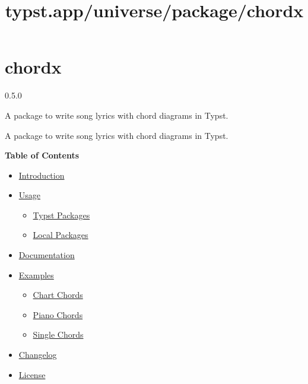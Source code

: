 \title{typst.app/universe/package/chordx}

\label{banner}
\section{chordx}\label{chordx}

{ 0.5.0 }

A package to write song lyrics with chord diagrams in Typst.

\label{readme}
A package to write song lyrics with chord diagrams in Typst.

\textbf{Table of Contents}

\begin{itemize}
\tightlist
\item
  \href{https://github.com/typst/packages/raw/main/packages/preview/chordx/0.5.0/\#introduction}{Introduction}
\item
  \href{https://github.com/typst/packages/raw/main/packages/preview/chordx/0.5.0/\#usage}{Usage}

  \begin{itemize}
  \tightlist
  \item
    \href{https://github.com/typst/packages/raw/main/packages/preview/chordx/0.5.0/\#typst-packages}{Typst
    Packages}
  \item
    \href{https://github.com/typst/packages/raw/main/packages/preview/chordx/0.5.0/\#local-packages}{Local
    Packages}
  \end{itemize}
\item
  \href{https://github.com/typst/packages/raw/main/packages/preview/chordx/0.5.0/\#documentation}{Documentation}
\item
  \href{https://github.com/typst/packages/raw/main/packages/preview/chordx/0.5.0/\#examples}{Examples}

  \begin{itemize}
  \tightlist
  \item
    \href{https://github.com/typst/packages/raw/main/packages/preview/chordx/0.5.0/\#chart-chords}{Chart
    Chords}
  \item
    \href{https://github.com/typst/packages/raw/main/packages/preview/chordx/0.5.0/\#piano-chords}{Piano
    Chords}
  \item
    \href{https://github.com/typst/packages/raw/main/packages/preview/chordx/0.5.0/\#single-chords}{Single
    Chords}
  \end{itemize}
\item
  \href{https://github.com/typst/packages/raw/main/packages/preview/chordx/0.5.0/\#changelog}{Changelog}
\item
  \href{https://github.com/typst/packages/raw/main/packages/preview/chordx/0.5.0/\#license}{License}
\end{itemize}

